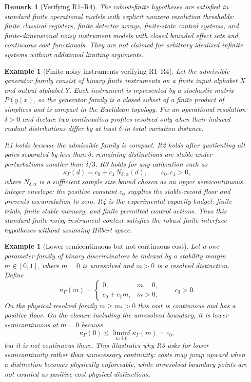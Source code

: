 \documentclass[11pt]{article}
\newtheorem{example}[theorem]{Example}
\newtheorem{remark}[theorem]{Remark}
\begin{document}
\begin{remark}[Verifying R1--R4]
The robust-finite hypotheses are satisfied in standard finite operational models with explicit nonzero resolution thresholds: finite classical registers, finite detector arrays, finite-state control systems, and finite-dimensional noisy instrument models with closed bounded effect sets and continuous cost functionals.  They are not claimed for arbitrary idealized infinite systems without additional limiting arguments.
\end{remark}


\begin{example}[Finite noisy instruments verifying R1--R4]\label{ex:finite-noisy-instrument-r1r4}
Let the admissible generator family consist of binary finite instruments on a finite input alphabet $X$ and output alphabet $Y$.  Each instrument is represented by a stochastic matrix $P(y\mid x)$, so the generator family is a closed subset of a finite product of simplices and is compact in the Euclidean topology.  Fix an operational resolution $\delta>0$ and declare two continuation profiles resolved only when their induced readout distributions differ by at least $\delta$ in total variation distance.

R1 holds because the admissible family is compact.  R2 holds after quotienting all pairs separated by less than $\delta$: remaining distinctions are stable under perturbations smaller than $\delta/3$.  R3 holds for any calibration such as
\[
  \kappa_\Gamma(d)=c_0+c_1\,N_{\delta,\alpha}(d),
  \qquad c_0,c_1>0,
\]
where $N_{\delta,\alpha}$ is a sufficient sample size bound chosen as an upper semicontinuous integer envelope; the positive constant $c_0$ supplies the stable-record floor and prevents accumulation to zero.  R4 is the experimental capacity budget: finite trials, finite stable memory, and finite permitted control actions.  Thus this standard finite noisy-instrument context satisfies the robust finite-interface hypotheses without assuming Hilbert space.
\end{example}


\begin{example}[Lower semicontinuous but not continuous cost]\label{ex:lsc-not-continuous-cost}
Let a one-parameter family of binary discriminators be indexed by a stability margin $m\in[0,1]$, where $m=0$ is unresolved and $m>0$ is a resolved distinction.  Define
\[
  \kappa_\Gamma(m)=
  \begin{cases}
  0, & m=0,\\
  c_0+c_1 m, & m>0,
  \end{cases}
  \qquad c_0>0.
\]
On the physical resolved family $m\ge m_*>0$ this cost is continuous and has a positive floor.  On the closure including the unresolved boundary, it is lower semicontinuous at $m=0$ because
\[
  \kappa_\Gamma(0)\le \liminf_{m\downarrow0}\kappa_\Gamma(m)=c_0,
\]
but it is not continuous there.  This illustrates why R3 asks for lower semicontinuity rather than unnecessary continuity: costs may jump upward when a distinction becomes physically enforceable, while unresolved boundary points are not counted as positive-cost physical distinctions.
\end{example}
\end{document}

